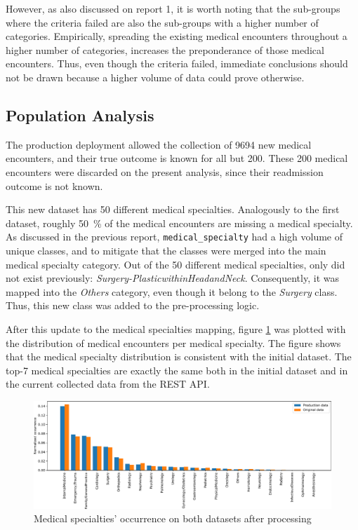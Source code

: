\documentclass[a4paper,11pt]{article}
\newcommand{\medicalSpecialty}{\texttt{medical\_specialty}\xspace}
\begin{document}
However, as also discussed on report 1, it is worth noting that the sub-groups where the criteria failed are also the sub-groups with a higher number of categories. Empirically, spreading the existing medical encounters throughout a higher number of categories, increases the preponderance of those medical encounters. Thus, even though the criteria failed, immediate conclusions should not be drawn because a higher volume of data could prove otherwise.

\subsection{Population Analysis}
\label{sec:population_analysis}


The production deployment allowed the collection of \SI{9694}{} new medical encounters, and their true outcome is known for all but \SI{200}{}. 
These \SI{200}{} medical encounters were discarded on the present analysis, since their readmission outcome is not known.

This new dataset has \SI{50}{} different medical specialties. Analogously to the first dataset, roughly \SI{50}{\percent} of the medical encounters are missing a medical specialty. 
As discussed in the previous report, \medicalSpecialty had a high volume of unique classes, and to mitigate that the classes were merged into the main medical specialty category.
Out of the \SI{50}{} different medical specialties, only did not exist previously: \textit{Surgery-PlasticwithinHeadandNeck}. Consequently, it was mapped into the \textit{Others} category, even though it belong to the \textit{Surgery} class. Thus, this new class was added to the pre-processing logic.

After this update to the medical specialties mapping, figure \ref{fig:medical_specialty_cardinality} was plotted with the distribution of medical encounters per medical specialty. The figure shows that the medical specialty distribution is consistent with the initial dataset. The top-7 medical specialties are exactly the same both in the initial dataset and in the current collected data from the REST API.

\begin{figure}[!htb]
	\centering
	\includegraphics[width=1\textwidth]{images/week1_medical_specialties.pdf}
	\caption{Medical specialties' occurrence on both datasets after processing}
	\label{fig:medical_specialty_cardinality}
\end{figure}
\end{document}
